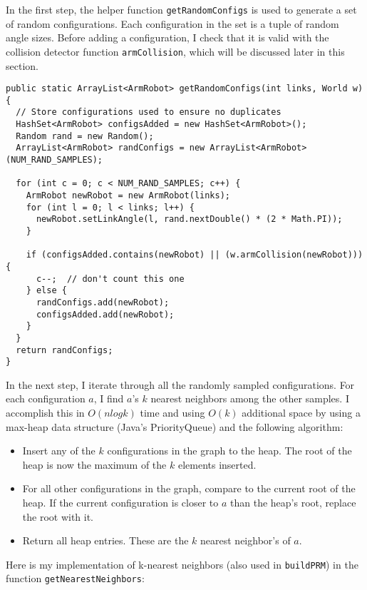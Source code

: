 \documentclass{article}
\begin{document}
In the first step, the helper function \verb`getRandomConfigs` is used to generate a set of random configurations. Each configuration in the set is a tuple of random angle sizes. Before adding a configuration, I check that it is valid with the collision detector function \verb`armCollision`, which will be discussed later in this section.

\vspace{10mm}

\begin{lstlisting}
public static ArrayList<ArmRobot> getRandomConfigs(int links, World w) {
  // Store configurations used to ensure no duplicates
  HashSet<ArmRobot> configsAdded = new HashSet<ArmRobot>();
  Random rand = new Random();
  ArrayList<ArmRobot> randConfigs = new ArrayList<ArmRobot>(NUM_RAND_SAMPLES);
  
  for (int c = 0; c < NUM_RAND_SAMPLES; c++) {
    ArmRobot newRobot = new ArmRobot(links);      
    for (int l = 0; l < links; l++) {
      newRobot.setLinkAngle(l, rand.nextDouble() * (2 * Math.PI));
    }
    
    if (configsAdded.contains(newRobot) || (w.armCollision(newRobot))) {
      c--;  // don't count this one
    } else {
      randConfigs.add(newRobot);
      configsAdded.add(newRobot);
    }
  }
  return randConfigs;
}
\end{lstlisting}

\vspace{10mm}

In the next step, I iterate through all the randomly sampled configurations. For each configuration $a$, I find $a$'s $k$ nearest neighbors among the other samples. I accomplish this in $O(nlogk)$ time and using $O(k)$ additional space by using a max-heap data structure (Java's PriorityQueue) and the following algorithm:

\begin{itemize}
  \item Insert any of the $k$ configurations in the graph to the heap. The root of the heap is now the maximum of the $k$ elements inserted.
  \item For all other configurations in the graph, compare to the current root of the heap. If the current configuration is closer to $a$ than the heap's root, replace the root with it.
  \item Return all heap entries. These are the $k$ nearest neighbor's of $a$.
\end{itemize}

Here is my implementation of k-nearest neighbors (also used in \verb`buildPRM`) in the function \verb`getNearestNeighbors`:
\end{document}
